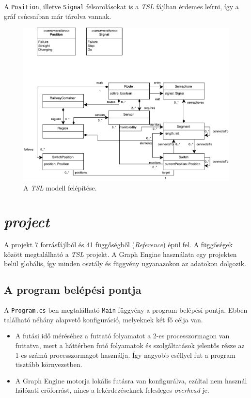 A \texttt{Position}, illetve \texttt{Signal} felsorolásokat is a \emph{TSL} fájlban érdemes leírni, így a gráf csúcsaiban már tárolva vannak.

\begin{figure}[H]
	\centering
	\includegraphics[width=\linewidth, keepaspectratio]{figures/GraphEngineTSLModel.pdf}
	\caption{A \emph{TSL} modell felépítése.}
	\label{fig:GraphEngineTSLModel}
\end{figure}

\section{\emph{\Csh{} project}}

A projekt 7 forrásfájlból és 41 függőségből (\emph{Reference}) épül fel. A függőségek között megtalálható a \emph{TSL} projekt. A Graph Engine használata egy projekten belül globális, így minden osztály és függvény ugyanazokon az adatokon dolgozik.

\subsection{A program belépési pontja}

A \texttt{Program.cs}-ben megtalálható \texttt{Main} függvény a program belépési pontja. Ebben található néhány alapvető konfiguráció, melyeknek két fő célja van.
\begin{itemize}
	\item A futási idő méréséhez a futtató folyamatot a 2-es processzormagon van futtatva, mert a háttérben futó folyamatok és szolgáltatások jelentős része az 1-es számú processzormagot használja. Így nagyobb eséllyel fut a program tisztább környezetben.
	\item A Graph Engine motorja lokális futásra van konfigurálva, ezáltal nem használ hálózati erőforrást, nincs a lekérdezéseknek felesleges \emph{overhead}-je.
\end{itemize}

